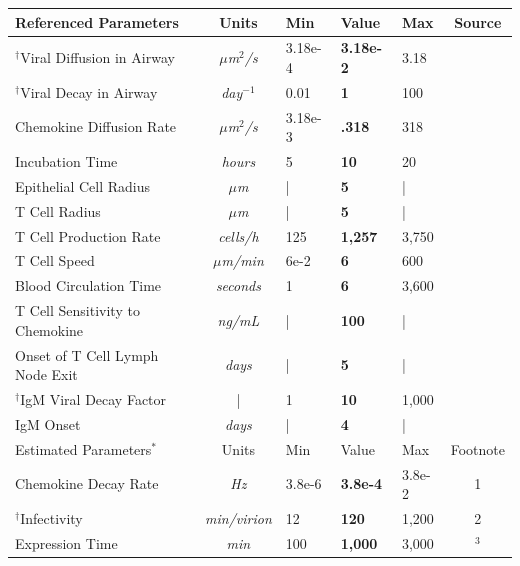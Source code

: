 \documentclass[preprint,10pt,authoryear]{elsarticle}
\begin{document}
\begin{table}[!ht]
\begin{center}
\begin{tabular}{| l | c | l l l | c |}
  \hline                        
  Referenced Parameters & Units & Min & Value & Max & Source \\
  \hline
  $^{\dagger}$Viral Diffusion in Airway & \textit{$\mu$m$^2$/s} & 3.18e-4 & \textbf{3.18e-2} & 3.18  & \citep{Beauchemin2006} \\
  $^{\dagger}$Viral Decay in Airway & \textit{day$^{-1}$} & 0.01 & \textbf{1} & 100 & \citep{Lee2009} \\
  Chemokine Diffusion Rate & \textit{$\mu$m$^2$/s} & 3.18e-3 & \textbf{.318} & 318 & \citep{Beauchemin2006} \\
  Incubation Time & \textit{hours} & 5 & \textbf{10} & 20 & \citep{Mitchell2011} \\
  Epithelial Cell Radius & \textit{$\mu$m} & | & \textbf{5} & | & \citep{Elbert1999} \\
  T Cell Radius & \textit{$\mu$m} & | & \textbf{5} & | & \citep{abbas2011cellular} \\
  T Cell Production Rate & \textit{cells/h} & 125 & \textbf{1,257} & 3,750 & \citep{Miao2010a} \\ 
  T Cell Speed & \textit{$\mu$m/min} & 6e-2 & \textbf{6} & 600 & \citep{Egen2011} \\
  Blood Circulation Time & \textit{seconds} & 1 & \textbf{6} & 3,600 & \citep{Banerjee2010b} \\
  T Cell Sensitivity to Chemokine & \textit{ng/mL} & | & \textbf{100} & | & \citep{Nandagopal2011} \\
  Onset of T Cell Lymph Node Exit & \textit{days }& | & \textbf{5} & | & \citep{Banerjee2011} \\
  $^{\dagger}$IgM Viral Decay Factor & | & 1 & \textbf{10} & 1,000 & \citep{Diamond2003} \\
  IgM Onset & \textit{days} & | & \textbf{4} & | & \citep{Diamond2003} \\
  \hline
  \hline                        
  Estimated Parameters$^*$ & Units & Min & Value & Max & Footnote \\
  \hline
  Chemokine Decay Rate & \textit{Hz} & 3.8e-6 & \textbf{3.8e-4} & 3.8e-2 & 1\\
  $^{\dagger}$Infectivity & \textit{min/virion} & 12 & \textbf{120} & 1,200   &  2 \\
  Expression Time & \textit{min} & 100 & \textbf{1,000} & 3,000 & \citep{Mitchell2011}$^3$ \\

\end{tabular}
\end{center}
\end{table}
\end{document}
